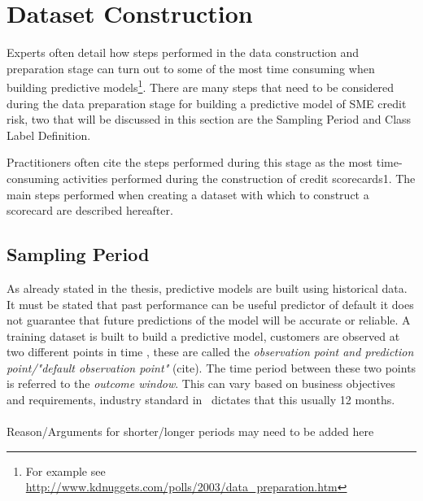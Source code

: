 \section{Dataset Construction}\label{sec:datasetConstruction}

Experts often detail how steps performed in the data construction and preparation stage can turn out to some of the most time consuming  when building predictive models\footnote{For example see \url{http://www.kdnuggets.com/polls/2003/data_preparation.htm}}. There are many steps that need to be considered during the data preparation stage for building a predictive model of SME credit risk, two that will be discussed in this section are the Sampling Period and Class Label Definition. 

Practitioners often cite the steps performed during this stage as the most time-consuming
activities performed during the construction of credit scorecards1. The
main steps performed when creating a dataset with which to construct a scorecard
are described hereafter.

\subsection{Sampling Period}
As already stated in the thesis, predictive models are built using historical data. It must be stated that past performance can be useful predictor of default it does not guarantee that future predictions of the model will be accurate or reliable. A training dataset is built to build a predictive model, customers are observed at two different points in time \citep{martens_credit_2010}, these are called the \textit{observation point and prediction point/"default observation point"} (cite). The time period between these two points is referred to the \textit{outcome window}. This can vary based on business objectives and requirements, industry standard in \subjectname\ dictates that this usually 12 months. \\\\

Reason/Arguments for shorter/longer periods may need to be added here \\


